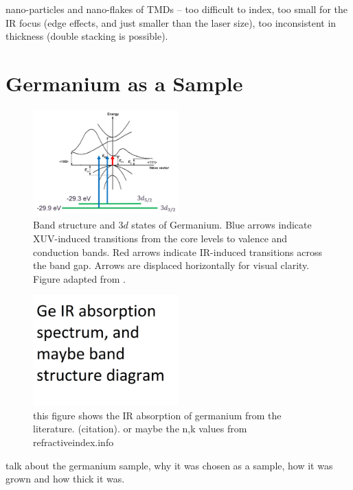 nano-particles and nano-flakes of TMDs -- too difficult to index, too small for the IR focus (edge effects, and just smaller than the laser size), too inconsistent in thickness (double stacking is possible). 


\section{Germanium as a Sample}

\begin{figure}
	\centering
	\includegraphics[width=0.5\textwidth]{figures/chap3/Ge_band_diagram.png}
	\caption{Band structure and $3d$ states of Germanium. Blue arrows indicate XUV-induced transitions from the core levels to valence and conduction bands. Red arrows indicate IR-induced transitions across the band gap. Arrows are displaced horizontally for visual clarity. Figure adapted from \cite{NSMArchivePhysical}.}
	\label{fig:Ge_band_diagram}
\end{figure}

\begin{figure}
	\centering
	\includegraphics[width=0.5\textwidth]{figures/chap3/Ge_IR_absorption.png}
	\caption{this figure shows the IR absorption of germanium from the literature. (citation). or maybe the n,k values from refractiveindex.info}
	\label{fig:Ge_IR_absorption}
\end{figure}

talk about the germanium sample, why it was chosen as a sample, how it was grown and how thick it was.



